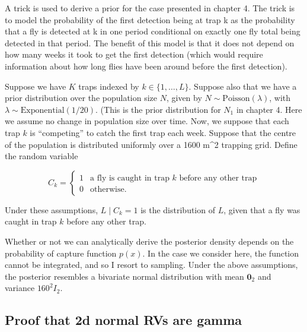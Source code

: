 \documentclass[
  oneside]{book}
\begin{document}
A trick is used to derive a prior for the case presented in chapter 4. The trick is to model the probability of the first detection being at trap k as the probability that a fly is detected at k in one period conditional on exactly one fly total being detected in that period. The benefit of this model is that it does not depend on how many weeks it took to get the first detection (which would require information about how long flies have been around before the first detection).

Suppose we have \(K\) traps indexed by \(k \in \{1, \ldots, L\}\). Suppose also that we have a prior distribution over the population size \(N\), given by \(N \sim \mathrm{Poisson} (\lambda)\), with \(\lambda \sim \mathrm{Exponential(1/20)}\). (This is the prior distribution for \(N_1\) in chapter 4. Here we assume no change in population size over time. Now, we suppose that each trap \(k\) is ``competing'' to catch the first trap each week. Suppose that the centre of the population is distributed uniformly over a 1600 m\^{}2 trapping grid. Define the random variable

\[
C_k = \begin{cases}1 & \text{a fly is caught in trap } k \text{ before any other trap} \\ 0 & \text{otherwise}. \end{cases}
\]

Under these assumptions, \(L \mid C_k = 1\) is the distribution of \(L\), given that a fly was caught in trap \(k\) before any other trap.

Whether or not we can analytically derive the posterior density depends on the probability of capture function \(p(x)\). In the case we consider here, the function cannot be integrated, and so I resort to sampling. Under the above assumptions, the posterior resembles a bivariate normal distribution with mean \(\mathbf 0_2\) and variance \(160^2 I_2\).

\hypertarget{proof-that-2d-normal-rvs-are-gamma}{%
\subsection{Proof that 2d normal RVs are gamma}\label{proof-that-2d-normal-rvs-are-gamma}}

  
\end{document}
